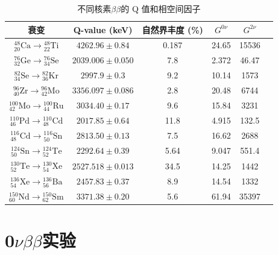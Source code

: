 \begin{table}[htbp]
    \centering
    \begin{tabular}{c c c c c c}
        \hline
        \textbf{衰变} & \textbf{Q-value  (keV) } & \textbf{自然界丰度  (\%) } & \textbf{$G^{0\nu}$} & \textbf{$G^{2\nu}$} \\
        \hline
        ${}^{48}_{20}\text{Ca} \rightarrow {}^{48}_{22}\text{Ti}$ & $4262.96 \pm 0.84$  & 0.187 & 24.65  & 15536 & \\
        ${}^{76}_{32}\text{Ge} \rightarrow {}^{76}_{34}\text{Se}$ & $2039.006 \pm 0.050$ & 7.8   & 2.372  & 46.47 \\
        ${}^{82}_{34}\text{Se} \rightarrow {}^{82}_{36}\text{Kr}$ & $2997.9 \pm 0.3$    & 9.2   & 10.14  & 1573  \\
        ${}^{96}_{40}\text{Zr} \rightarrow {}^{96}_{42}\text{Mo}$ & $3356.097 \pm 0.086$ & 2.8   & 20.48  & 6744  \\
        ${}^{100}_{42}\text{Mo} \rightarrow {}^{100}_{44}\text{Ru}$ & $3034.40 \pm 0.17$  & 9.6   & 15.84  & 3231  \\
        ${}^{110}_{46}\text{Pd} \rightarrow {}^{110}_{48}\text{Cd}$ & $2017.85 \pm 0.64$  & 11.8  & 4.915  & 132.5 \\
        ${}^{116}_{48}\text{Cd} \rightarrow {}^{116}_{50}\text{Sn}$ & $2813.50 \pm 0.13$  & 7.5   & 16.62  & 2688  \\
        ${}^{124}_{50}\text{Sn} \rightarrow {}^{124}_{52}\text{Te}$ & $2292.64 \pm 0.39$  & 5.64  & 9.047  & 551.4 \\
        ${}^{130}_{52}\text{Te} \rightarrow {}^{130}_{54}\text{Xe}$ & $2527.518 \pm 0.013$ & 34.5  & 14.25  & 1442  \\
        ${}^{136}_{54}\text{Xe} \rightarrow {}^{136}_{56}\text{Ba}$ & $2457.83 \pm 0.37$  & 8.9   & 14.54  & 1332  \\
        ${}^{150}_{60}\text{Nd} \rightarrow {}^{150}_{62}\text{Sm}$ & $3371.38 \pm 0.20$  & 5.6   & 61.94  & 35397 \\
        \hline
    \end{tabular}
    \caption{不同核素$\beta\beta$的 Q 值和相空间因子\cite{ParticleDataGroup:2024cfk}}
    \label{tab:bb}
\end{table}



\section{0$\nu\beta\beta$实验}

